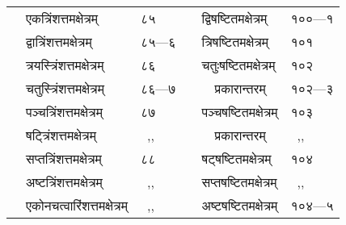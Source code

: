 \documentclass[11pt, openany]{book}
\begin{document}
\begin{center}
\begin{tabular}{p{1.5in} l | p{1.5in} l}
~~एकत्रिंशत्तमक्षेत्रम् & ८५ & ~~द्विषष्टितमक्षेत्रम् & १००---१\\
~~द्वात्रिंशत्तमक्षेत्रम् & ८५---६ & ~~त्रिषष्टितमक्षेत्रम् & १०१\\
~~त्रयस्त्रिंशत्तमक्षेत्रम् & ८६ & ~~चतुःषष्टितमक्षेत्रम् & १०२\\
~~चतुस्त्रिंशत्तमक्षेत्रम् & ८६---७ & ~~~~प्रकारान्तरम् & १०२---३\\
~~पञ्चत्रिंशत्तमक्षेत्रम् & ८७ & ~~पञ्चषष्टितमक्षेत्रम् & १०३\\
~~षट्त्रिंशत्तमक्षेत्रम् & ~,, & ~~~~प्रकारान्तरम् & ~,,\\
~~सप्तत्रिंशत्तमक्षेत्रम् & ८८ & ~~षट्षष्टितमक्षेत्रम् & १०४\\
~~अष्टत्रिंशत्तमक्षेत्रम् & ~,, & ~~सप्तषष्टितमक्षेत्रम् & ~,,\\
~~एकोनचत्वारिंशत्तमक्षेत्रम् & ~,, & ~~अष्टषष्टितमक्षेत्रम् & १०४---५\\
\end{tabular}
\end{center}
 
\end{document}

